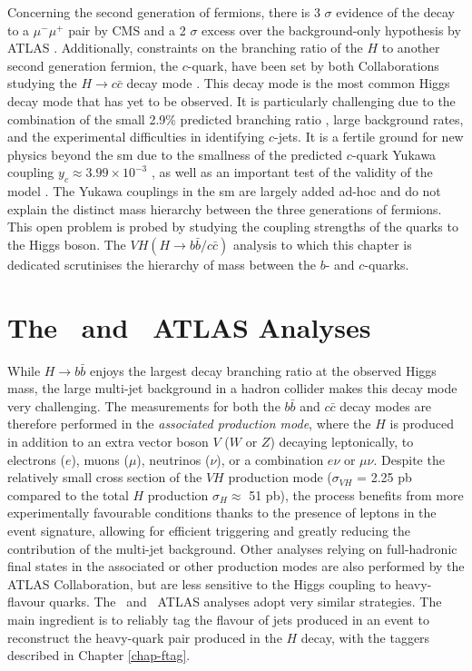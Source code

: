 Concerning the second generation of fermions, there is 3 $\sigma$ evidence of the decay to a $\mu^-\mu^+$ pair by CMS \cite{CMS:2020xwi} and a 2 $\sigma$ excess over the background-only hypothesis by ATLAS \cite{ATLAS:2020fzp}. Additionally, constraints on the branching ratio of the $H$ to another second generation fermion, the $c$-quark, have been set by both Collaborations studying the $H \rightarrow c\bar{c}$ decay mode \cite{Aaboud:2018fhh}. This decay mode is the most common Higgs decay mode that has yet to be observed. It is particularly challenging due to the combination of the small 2.9\% predicted branching ratio \cite{DJOUADI199856}, large background rates, and the experimental difficulties in identifying $c$-jets. It is a fertile ground for new physics beyond the \gls{sm} due to the smallness of the predicted $c$-quark Yukawa coupling $y_c \approx 3.99 \times 10^{-3} $ \cite{yukawac}, as well as an important test of the validity of the model \cite{PhysRevD.89.033014,PhysRevD.92.033016,Botella:2016krk,PhysRevD.98.055001,GHOSH2016504,PhysRevLett.123.031802,PhysRevD.100.115041}. The Yukawa couplings in the \gls{sm} are largely added ad-hoc and do not explain the distinct mass hierarchy between the three generations of fermions. This open problem is probed by studying the coupling strengths of the quarks to the Higgs boson. The $VH (H \rightarrow b\bar{b}/c\bar{c})$ analysis to which this chapter is dedicated scrutinises the hierarchy of mass between the $b$- and $c$-quarks.

\section[The \vhb\ and \vhc\ ATLAS Analyses]{The \boldvhb\ and \boldvhc\ ATLAS Analyses}
While $H \rightarrow b\bar{b}$ enjoys the largest decay branching ratio at the observed Higgs mass, the large multi-jet background in a hadron collider makes this decay mode very challenging. The measurements for both the $b\bar{b}$ and $c\bar{c}$ decay modes are therefore performed in the \textit{associated production mode}, where the $H$ is produced in addition to an extra vector boson $V$ ($W$ or $Z$) decaying leptonically, to electrons ($e$), muons ($\mu$), neutrinos ($\nu$), or a combination $e\nu$ or $\mu\nu$. Despite the relatively small cross section of the $VH$ production mode ($\sigma_{VH}$ = 2.25 pb compared to the total $H$ production $\sigma_H \approx$ 51 pb), the process benefits from more experimentally favourable conditions thanks to the presence of leptons in the event signature, allowing for efficient triggering and greatly reducing the contribution of the multi-jet background. Other analyses relying on full-hadronic final states in the associated or other production modes are also performed by the ATLAS Collaboration, but are less sensitive to the Higgs coupling to heavy-flavour quarks. The \vhb\ and \vhc\ ATLAS analyses adopt very similar strategies. The main ingredient is to reliably tag the flavour of jets produced in an event to reconstruct the heavy-quark pair produced in the $H$ decay, with the taggers described in Chapter \ref{chap-ftag}. \\ 

